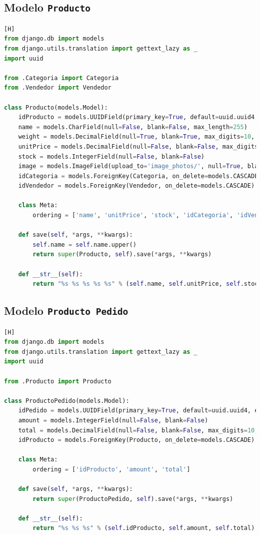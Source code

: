\documentclass{article}
\begin{document}
\subsection*{Modelo \texttt{Producto}}
		  \begin{lstlisting}[language=Python,caption={Producto.py}][H]
from django.db import models
from django.utils.translation import gettext_lazy as _
import uuid

from .Categoria import Categoria
from .Vendedor import Vendedor

class Producto(models.Model):
    idProducto = models.UUIDField(primary_key=True, default=uuid.uuid4, editable=False)
    name = models.CharField(null=False, blank=False, max_length=255)
    weight = models.DecimalField(null=True, blank=True, max_digits=10, decimal_places=2)
    unitPrice = models.DecimalField(null=False, blank=False, max_digits=10, decimal_places=2)
    stock = models.IntegerField(null=False, blank=False)
    image = models.ImageField(upload_to='image_photos/', null=True, blank=True)
    idCategoria = models.ForeignKey(Categoria, on_delete=models.CASCADE)
    idVendedor = models.ForeignKey(Vendedor, on_delete=models.CASCADE)

    class Meta:
        ordering = ['name', 'unitPrice', 'stock', 'idCategoria', 'idVendedor']

    def save(self, *args, **kwargs):
        self.name = self.name.upper()
        return super(Producto, self).save(*args, **kwargs)

    def __str__(self):
        return "%s %s %s %s %s" % (self.name, self.unitPrice, self.stock, self.idCategoria, self.idVendedor)
    \end{lstlisting}

\subsection*{Modelo \texttt{Producto Pedido}}
		  \begin{lstlisting}[language=Python,caption={ProductoPedido.py}][H]
from django.db import models
from django.utils.translation import gettext_lazy as _
import uuid

from .Producto import Producto

class ProductoPedido(models.Model):
    idPedido = models.UUIDField(primary_key=True, default=uuid.uuid4, editable=False)
    amount = models.IntegerField(null=False, blank=False)
    total = models.DecimalField(null=False, blank=False, max_digits=10, decimal_places=2, default=0.00)
    idProducto = models.ForeignKey(Producto, on_delete=models.CASCADE)

    class Meta:
        ordering = ['idProducto', 'amount', 'total']

    def save(self, *args, **kwargs):
        return super(ProductoPedido, self).save(*args, **kwargs)

    def __str__(self):
        return "%s %s %s" % (self.idProducto, self.amount, self.total)
    \end{lstlisting}
\end{document}
